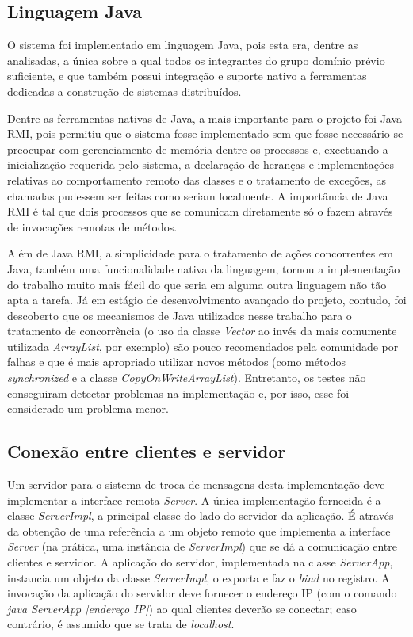 \documentclass[../main.tex]{subfiles}
\begin{document}
\subsection{Linguagem Java}

O sistema foi implementado em linguagem Java, pois esta era, dentre as analisadas, a única sobre a qual todos os integrantes do grupo domínio prévio suficiente, e que também possui integração e suporte nativo a ferramentas dedicadas a construção de sistemas distribuídos.

Dentre as ferramentas nativas de Java, a mais importante para o projeto foi Java RMI, pois permitiu que o sistema fosse implementado sem que fosse necessário se preocupar com gerenciamento de memória dentre os processos e, excetuando a inicialização requerida pelo sistema, a declaração de heranças e implementações relativas ao comportamento remoto das classes e o tratamento de exceções, as chamadas pudessem ser feitas como seriam localmente.
A importância de Java RMI é tal que dois processos que se comunicam diretamente só o fazem através de invocações remotas de métodos.

Além de Java RMI, a simplicidade para o tratamento de ações concorrentes em Java, também uma funcionalidade nativa da linguagem, tornou a implementação do trabalho muito mais fácil do que seria em alguma outra linguagem não tão apta a tarefa.
Já em estágio de desenvolvimento avançado do projeto, contudo, foi descoberto que os mecanismos de Java utilizados nesse trabalho para o tratamento de concorrência (o uso da classe \textit{Vector} ao invés da mais comumente utilizada \textit{ArrayList}, por exemplo) são pouco recomendados pela comunidade por falhas e que é mais apropriado utilizar novos métodos (como métodos \textit{synchronized} e a classe \textit{CopyOnWriteArrayList}).
Entretanto, os testes não conseguiram detectar problemas na implementação e, por isso, esse foi considerado um problema menor.

\subsection{Conexão entre clientes e servidor}

Um servidor para o sistema de troca de mensagens desta implementação deve implementar a interface remota \textit{Server}.
A única implementação fornecida é a classe \textit{ServerImpl}, a principal classe do lado do servidor da aplicação.
É através da obtenção de uma referência a um objeto remoto que implementa a interface \textit{Server} (na prática, uma instância de \textit{ServerImpl}) que se dá a comunicação entre clientes e servidor.
A aplicação do servidor, implementada na classe \textit{ServerApp}, instancia um objeto da classe \textit{ServerImpl}, o exporta e faz o \textit{bind} no registro.
A invocação da aplicação do servidor deve fornecer o endereço IP (com o comando \textit{java ServerApp [endereço IP]}) ao qual clientes deverão se conectar; caso contrário, é assumido que se trata de \textit{localhost}.
\end{document}
